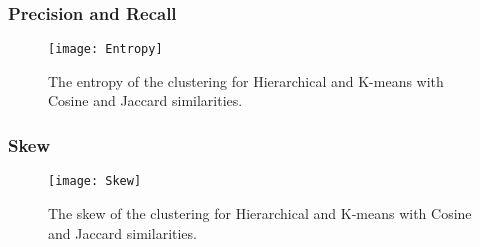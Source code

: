 \documentclass{article}
\begin{document}
\subsubsection{Precision and Recall}

\begin{figure}
\centering
\texttt{[image: Entropy]}
\caption{\footnotesize The entropy of the clustering for Hierarchical and K-means
with Cosine and Jaccard similarities.}
\label{Fig:entropy}
\end{figure}

\subsubsection{Skew}

\begin{figure}[b!]
\centering
\texttt{[image: Skew]}
\caption{\footnotesize The skew of the clustering for Hierarchical and K-means
with Cosine and Jaccard similarities.}
\label{Fig:skew}
\end{figure}
\end{document}
